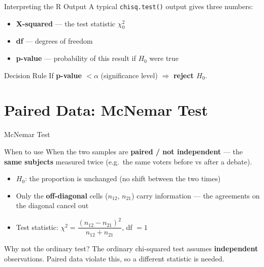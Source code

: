 \documentclass{beamer}					%
\begin{document}
\begin{frame}{Interpreting the R Output}
\small
A typical \texttt{chisq.test()} output gives three numbers:

\vspace{0.6em}
\begin{itemize}
    \item \textbf{X-squared} --- the test statistic $\chi^2_0$
    \item \textbf{df} --- degrees of freedom
    \item \textbf{p-value} --- probability of this result if $H_0$ were true
\end{itemize}

\vspace{0.8em}
\begin{block}{Decision Rule}
If \textbf{p-value $< \alpha$} (significance level) $\Rightarrow$ \textbf{reject $H_0$}.
\end{block}

\end{frame}

\section{Paired Data: McNemar Test}
 
\begin{frame}{McNemar Test}
\small
\begin{block}{When to use}
When the two samples are \textbf{paired / not independent} --- the
\textbf{same subjects} measured twice (e.g.\ the same voters before vs
after a debate).
\end{block}
 
\vspace{0.5em}
\begin{itemize}
    \item $H_0$: the proportion is unchanged (no shift between the two times)
    \item Only the \textbf{off-diagonal} cells ($n_{12}$, $n_{21}$) carry information ---
          the agreements on the diagonal cancel out
    \item Test statistic: $\chi^2 = \dfrac{(n_{12} - n_{21})^2}{n_{12} + n_{21}}$, df $= 1$
\end{itemize}
 
\vspace{0.8em}
\begin{alertblock}{Why not the ordinary test?}
The ordinary chi-squared test assumes \textbf{independent} observations.
Paired data violate this, so a different statistic is needed.
\end{alertblock}
 
\end{frame}
 
\end{document}
